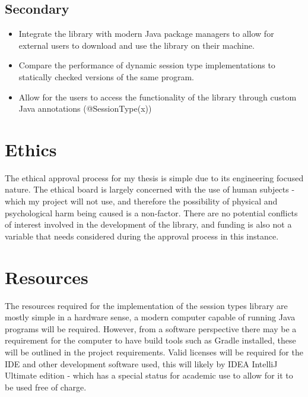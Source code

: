 \documentclass{article}
\begin{document}
\subsection{Secondary}
\begin{itemize}
	\item Integrate the library with modern Java package managers to allow for external users to download and use the library on their machine.
	\item Compare the performance of dynamic session type implementations to statically checked versions of the same program.
	\item Allow for the users to access the functionality of the library through custom Java annotations (@SessionType(x))
\end{itemize}
\section{Ethics}
The ethical approval process for my thesis is simple due to its engineering focused nature. The ethical board is largely concerned with the use of human subjects - which my project will not use, and therefore the possibility of physical and psychological harm being caused is a non-factor. There are no potential conflicts of interest involved in the development of the library, and funding is also not a variable that needs considered during the approval process in this instance.
\section{Resources}
The resources required for the implementation of the session types library are mostly simple in a hardware sense, a modern computer capable of running Java programs will be required. However, from a software perspective there may be a requirement for the computer to have build tools such as Gradle installed, these will be outlined in the project requirements. Valid licenses will be required for the IDE and other development software used, this will likely by IDEA IntelliJ Ultimate edition - which has a special status for academic use to allow for it to be used free of charge.
\end{document}
